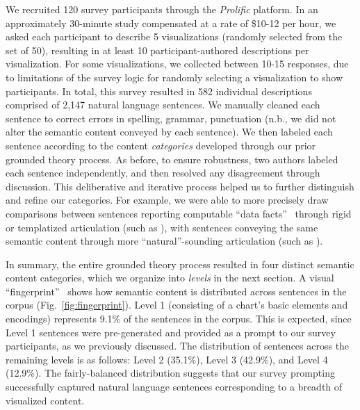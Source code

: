We recruited 120 survey participants through the \emph{Prolific} platform. In an approximately 30-minute study compensated at a rate of \$10-12 per hour, we asked each participant to describe 5 visualizations (randomly selected from the set of 50), resulting in at least 10 participant-authored descriptions per visualization.
For some visualizations, we collected between 10-15 responses, due to limitations of the survey logic for randomly selecting a visualization to show participants.
In total, this survey resulted in {582} individual descriptions comprised of {2,147} natural language sentences.
We manually cleaned each sentence to correct errors in spelling, grammar, punctuation (n.b., we did not alter the semantic content conveyed by each sentence).
We then labeled each sentence according to the content \emph{categories} developed through our prior grounded theory process.
As before, to ensure robustness, two authors labeled each sentence independently, and then resolved any disagreement through discussion.
This deliberative and iterative process helped us to further distinguish and refine our categories.
For example, we were able to more precisely draw comparisons between sentences reporting computable ``data facts''~\cite{srinivasan_augmenting_2019, wang_datashot_2020} through rigid or templatized articulation (such as ), with sentences conveying the same semantic content through more ``natural''-sounding articulation (such as ).

In summary, the entire grounded theory process resulted in four distinct semantic content categories, which we organize into \emph{levels} in the next section.
A visual ``fingerprint''~\cite{keim_literature_2007} shows how semantic content is distributed across sentences in the corpus (Fig.~\ref{fig:fingerprint}).
Level 1 (consisting of a chart's basic elements and encodings) represents 9.1\% of the sentences in the corpus.
This is expected, since Level 1 sentences were pre-generated and provided as a prompt to our survey participants, as we previously discussed.
The distribution of sentences across the remaining levels is as follows: Level 2 (35.1\%), Level 3 (42.9\%), and Level 4 (12.9\%).
The fairly-balanced distribution suggests that our survey prompting successfully captured natural language sentences corresponding to a breadth of visualized content.
